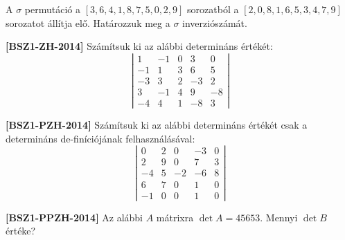 \documentclass[a4paper, 12pt]{article}
\begin{document}
        \noindent{}
        \noindent{}

        \begin{enumerate}
            \item A $\sigma$ permutáció a $[3, 6, 4, 1, 8, 7, 5, 0, 2, 9]$ sorozatból a $[2, 0, 8, 1, 6, 5, 3, 4, 7, 9]$ sorozatot állítja elő. Határozzuk meg a $\sigma$ inverziószámát.
            
            \noindent\begin{minipage}{0.45\textwidth}
                \item \textbf{[BSZ1-ZH-2014]} Számítsuk ki az alábbi determináns értékét:
                    \[\left|\begin{array}{rrrrr}
                        1  & -1 & 0 &  3 &  0 \\
                        -1 &  1 & 3 &  6 &  5 \\
                        -3 &  3 & 2 & -3 &  2 \\
                        3  & -1 & 4 &  9 & -8 \\
                        -4 &  4 & 1 & -8 &  3
                    \end{array}\right|\]
            \end{minipage}\hfill
            \noindent\begin{minipage}{0.45\textwidth}
                \item \textbf{[BSZ1-PZH-2014]} Számítsuk ki az alábbi determináns értékét csak a determináns de-finíciójának felhasználásával:
                \[\left|\begin{array}{rrrrr}
                        0  & 2 &  0 & -3 & 0 \\
                        2  & 9 &  0 &  7 & 3 \\
                        -4 & 5 & -2 & -6 & 8 \\
                        6  & 7 &  0 &  1 & 0 \\
                        -1 & 0 &  0 &  1 & 0
                \end{array}\right|\]
            \end{minipage}
            \item \textbf{[BSZ1-PPZH-2014]} Az alábbi $A$ mátrixra $\det A = 45653$. Mennyi $\det B$ értéke?
            \begin{figure}[h!]
                \centering
                \begin{subfigure}{0.4\textwidth}

\end{subfigure}
\end{figure}
\end{enumerate}
\end{document}
